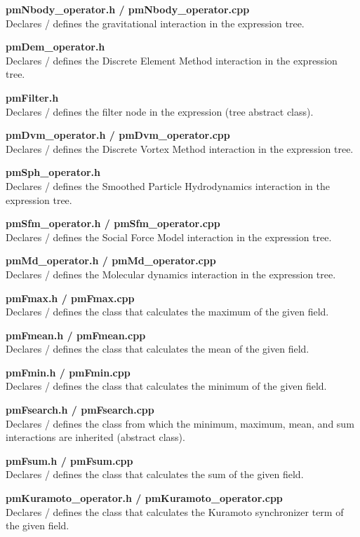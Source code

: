 \documentclass[a4paper,12pt,openany]{book}
\theoremstyle{break}
\begin{document}
\textbf{pmNbody\_operator.h / pmNbody\_operator.cpp} \\
Declares / defines the gravitational interaction in the expression tree.

\textbf{pmDem\_operator.h} \\
Declares / defines the Discrete Element Method interaction in the expression tree.

\textbf{pmFilter.h} \\
Declares / defines the filter node in the expression (tree abstract class).

\textbf{pmDvm\_operator.h / pmDvm\_operator.cpp} \\
Declares / defines the Discrete Vortex Method interaction in the expression tree.

\textbf{pmSph\_operator.h} \\
Declares / defines the Smoothed Particle Hydrodynamics interaction in the expression tree.

\textbf{pmSfm\_operator.h / pmSfm\_operator.cpp} \\
Declares / defines the Social Force Model interaction in the expression tree.

\textbf{pmMd\_operator.h / pmMd\_operator.cpp} \\
Declares / defines the Molecular dynamics interaction in the expression tree.

\textbf{pmFmax.h / pmFmax.cpp} \\
Declares / defines the class that calculates the maximum of the given field.

\textbf{pmFmean.h / pmFmean.cpp} \\
Declares / defines the class that calculates the mean of the given field.

\textbf{pmFmin.h / pmFmin.cpp} \\
Declares / defines the class that calculates the minimum of the given field.

\textbf{pmFsearch.h / pmFsearch.cpp} \\
Declares / defines the class from which the minimum, maximum, mean, and sum interactions are inherited (abstract class).

\textbf{pmFsum.h / pmFsum.cpp} \\
Declares / defines the class that calculates the sum of the given field.

\textbf{pmKuramoto\_operator.h / pmKuramoto\_operator.cpp} \\
Declares / defines the class that calculates the Kuramoto synchronizer term of the given field.
\end{document}
